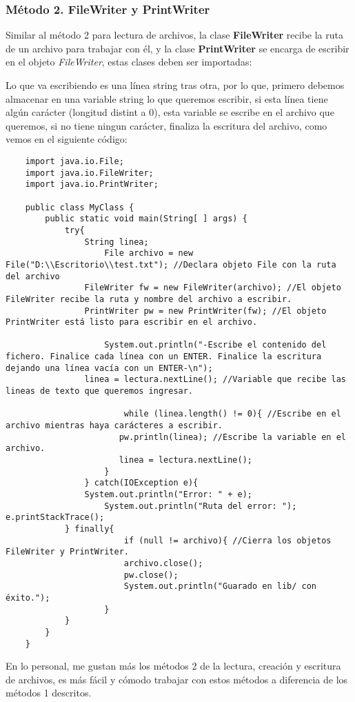 \subsubsection{Método 2. FileWriter y PrintWriter}
Similar al método 2 para lectura de archivos, la clase \textbf{FileWriter} recibe la ruta de un archivo para trabajar con él, y la clase \textbf{PrintWriter} se encarga de escribir en el objeto \textit{FileWriter}, estas clases deben ser importadas:\begin{center}\textit{import java.io.FileWriter;\}\end{center}
Lo que va escribiendo es una línea string tras otra, por lo que, primero debemos almacenar en una variable string lo que queremos escribir, si esta línea tiene algún carácter (longitud distint a 0), esta variable se escribe en el archivo que queremos, si no tiene ningun carácter, finaliza la escritura del archivo, como vemos en el siguiente código:
\begin{lstlisting}
	import java.io.File;
	import java.io.FileWriter;
	import java.io.PrintWriter;

	public class MyClass {
		public static void main(String[ ] args) {
			try{
				String linea;
		        	File archivo = new File("D:\\Escritorio\\test.txt"); //Declara objeto File con la ruta del archivo
				FileWriter fw = new FileWriter(archivo); //El objeto FileWriter recibe la ruta y nombre del archivo a escribir.
				PrintWriter pw = new PrintWriter(fw); //El objeto PrintWriter está listo para escribir en el archivo.
        
        			System.out.println("-Escribe el contenido del fichero. Finalice cada línea con un ENTER. Finalice la escritura dejando una línea vacía con un ENTER-\n");
				linea = lectura.nextLine(); //Variable que recibe las lineas de texto que queremos ingresar.

    		        	while (linea.length() != 0){ //Escribe en el archivo mientras haya carácteres a escribir.
         	    	   pw.println(linea); //Escribe la variable en el archivo.
             		   linea = lectura.nextLine();
	            	}
    		    } catch(IOException e){
         	   	System.out.println("Error: " + e);
            		System.out.println("Ruta del error: "); e.printStackTrace();
	        } finally{
    		        	if (null != archivo){ //Cierra los objetos FileWriter y PrintWriter.
         	    	    archivo.close();
             		    pw.close();
             			System.out.println("Guarado en lib/ con éxito.");
	        		}
	        }
	    }
	}
\end{lstlisting}
En lo personal, me gustan más los métodos 2 de la lectura, creación y escritura de archivos, es más fácil y cómodo trabajar con estos métodos a diferencia de los métodos 1 descritos.




